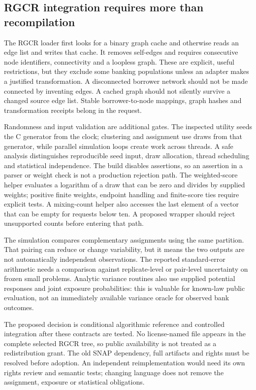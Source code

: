 \subsection{RGCR integration requires more than recompilation}

The RGCR loader first looks for a binary graph cache and otherwise reads an edge list and writes that cache. It removes self-edges and requires consecutive node identifiers, connectivity and a loopless graph. These are explicit, useful restrictions, but they exclude some banking populations unless an adapter makes a justified transformation. A disconnected borrower network should not be made connected by inventing edges. A cached graph should not silently survive a changed source edge list. Stable borrower-to-node mappings, graph hashes and transformation receipts belong in the request.~\citep{exec25_cnet_rgcr,exec25_cnet_choice}

Randomness and input validation are additional gates. The inspected utility seeds the C generator from the clock; clustering and assignment use draws from that generator, while parallel simulation loops create work across threads. A safe analysis distinguishes reproducible seed input, draw allocation, thread scheduling and statistical independence. The build disables assertions, so an assertion in a parser or weight check is not a production rejection path. The weighted-score helper evaluates a logarithm of a draw that can be zero and divides by supplied weights; positive finite weights, endpoint handling and finite-score ties require explicit tests. A mixing-count helper also accesses the last element of a vector that can be empty for requests below ten. A proposed wrapper should reject unsupported counts before entering that path.~\citep{exec25_cnet_rgcr}

The simulation compares complementary assignments using the same partition. That pairing can reduce or change variability, but it means the two outputs are not automatically independent observations. The reported standard-error arithmetic needs a comparison against replicate-level or pair-level uncertainty on frozen small problems. Analytic variance routines also use supplied potential responses and joint exposure probabilities: this is valuable for known-law public evaluation, not an immediately available variance oracle for observed bank outcomes.~\citep{exec25_cnet_rgcr,exec25_cnet_choice}

The proposed decision is conditional algorithmic reference and controlled integration after these contracts are tested. No license-named file appears in the complete selected RGCR tree, so public availability is not treated as a redistribution grant. The old SNAP dependency, full artifacts and rights must be resolved before adoption. An independent reimplementation would need its own rights review and semantic tests; changing language does not remove the assignment, exposure or statistical obligations.~\citep{exec25_cnet_choice}

